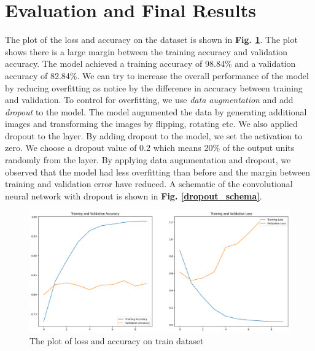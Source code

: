 \documentclass[11pt,a4paper]{article}
\begin{document}
\section{Evaluation and Final Results} 
The plot of the loss and accuracy on the dataset is shown in \textbf{Fig. \ref{cnn_loss}}. The plot shows there is a large margin between the training accuracy and validation accuracy. The model achieved a training accuracy of 98.84\% and a validation accuracy of 82.84\%.  We can try to increase the overall performance of the model by reducing overfitting as notice by the difference in accuracy between training and validation.  To control for overfitting, we use \emph{data augmentation} and add \emph{dropout} to the model.  The model augumented the data by generating additional images and transforming the images by flipping, rotating etc. We also applied dropout to the layer. By adding dropout to the model, we set the activation to zero. We choose a dropout value of 0.2 which means 20\% of the output units randomly from the layer.  By applying data augumentation and dropout, we observed that the model had less overfitting than before and the margin between training and validation error have reduced. A schematic of the convolutional neural network with dropout is shown in \textbf{Fig. \ref{dropout_schema}}. 

 \begin{figure}[h!]
 \centering
  \includegraphics[width=\linewidth]{training_valid_plot.png}
  \caption{The plot of loss and accuracy on train dataset}
  \label{cnn_loss}
\end{figure}
\end{document}
